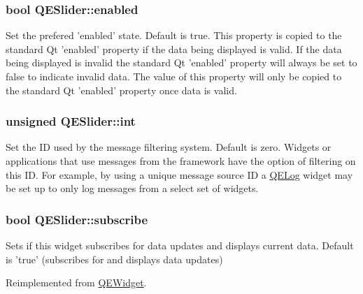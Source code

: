 \hypertarget{classQESlider_a7443c8c101d387a8d70a66e0e30b96ac}{
\subsubsection[{enabled}]{\setlength{\rightskip}{0pt plus 5cm}bool QESlider::enabled}}
\label{classQESlider_a7443c8c101d387a8d70a66e0e30b96ac}
Set the prefered 'enabled' state. Default is true. This property is copied to the standard Qt 'enabled' property if the data being displayed is valid. If the data being displayed is invalid the standard Qt 'enabled' property will always be set to false to indicate invalid data. The value of this property will only be copied to the standard Qt 'enabled' property once data is valid. \hypertarget{classQESlider_af63af49eb378a42d4fd143ab539b5514}{
\subsubsection[{int}]{\setlength{\rightskip}{0pt plus 5cm}unsigned QESlider::int}}
\label{classQESlider_af63af49eb378a42d4fd143ab539b5514}
Set the ID used by the message filtering system. Default is zero. Widgets or applications that use messages from the framework have the option of filtering on this ID. For example, by using a unique message source ID a \hyperlink{classQELog}{QELog} widget may be set up to only log messages from a select set of widgets. \hypertarget{classQESlider_a461c0ea162ed9dbaa19b351b78e816e5}{
\subsubsection[{subscribe}]{\setlength{\rightskip}{0pt plus 5cm}bool QESlider::subscribe}}
\label{classQESlider_a461c0ea162ed9dbaa19b351b78e816e5}
Sets if this widget subscribes for data updates and displays current data. Default is 'true' (subscribes for and displays data updates) 

Reimplemented from \hyperlink{classQEWidget}{QEWidget}.

